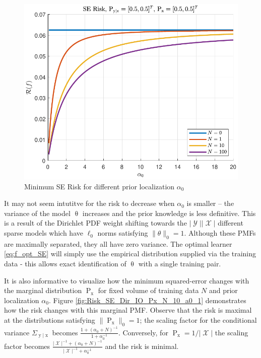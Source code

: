 \documentclass{article}
\DeclareMathOperator{\xrm}{\mathrm{x}}
\DeclareMathOperator{\yrm}{\mathrm{y}}
\DeclareMathOperator{\Prm}{\mathrm{P}}
\DeclareMathOperator{\Xcal}{\mathcal{X}}
\DeclareMathOperator{\Ycal}{\mathcal{Y}}
\begin{document}
\begin{figure}
\centering
\includegraphics[width=1.0\linewidth]{Risk_SE_Dir_IO_a0_leg_N.pdf}
\caption{Minimum SE Risk for different prior localization $\alpha_0$}
\label{fig:Risk_SE_Dir_IO_a0_leg_N}
\end{figure}

It may not seem intutitve for the risk to decrease when $\alpha_0$ is smaller -- the variance of the model $\uptheta$ increases and the prior knowledge is less definitive. This is a result of the Dirichlet PDF weight shifting towards the $|\Ycal||\Xcal|$ different sparse models which have $\ell_0$ norms satisfying $\| \theta \|_0 = 1$. Although these PMFs are maximally separated, they all have zero variance. The optimal learner \eqref{eq:f_opt_SE} will simply use the empirical distribution supplied via the training data - this allows exact identification of $\uptheta$ with a single training pair.

It is also informative to visualize how the minimum squared-error changes with the marginal distribution $\Prm_{\xrm}$ for fixed volume of training data $N$ and prior localization $\alpha_0$. Figure \ref{fig:Risk_SE_Dir_IO_Px_N_10_a0_1} demonstrates how the risk changes with this marginal PMF. Observe that the risk is maximal at the distributions satisfying $\| \Prm_{\xrm} \|_0 = 1$; the scaling factor for the conditional variance $\Sigma_{\yrm | \xrm}$ becomes $\frac{1 + (\alpha_0+N)^{-1}}{1 + \alpha_0^{-1}}$. Conversely, for $\Prm_{\xrm} = 1/|\Xcal|$ the scaling factor becomes $\frac{|\Xcal|^{-1} + (\alpha_0+N)^{-1}}{|\Xcal|^{-1} + \alpha_0^{-1}}$ and the risk is minimal. 
\end{document}
